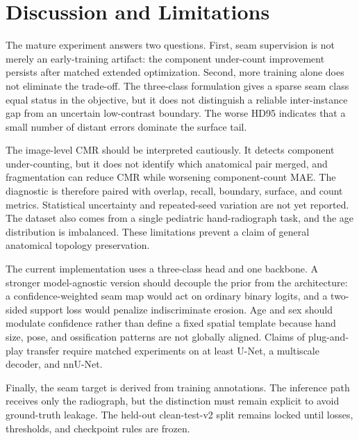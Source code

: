 \section{Discussion and Limitations}

The mature experiment answers two questions. First, seam supervision is not merely an early-training artifact: the component under-count improvement persists after matched extended optimization. Second, more training alone does not eliminate the trade-off. The three-class formulation gives a sparse seam class equal status in the objective, but it does not distinguish a reliable inter-instance gap from an uncertain low-contrast boundary. The worse HD95 indicates that a small number of distant errors dominate the surface tail.

The image-level CMR should be interpreted cautiously. It detects component under-counting, but it does not identify which anatomical pair merged, and fragmentation can reduce CMR while worsening component-count MAE. The diagnostic is therefore paired with overlap, recall, boundary, surface, and count metrics. Statistical uncertainty and repeated-seed variation are not yet reported. The dataset also comes from a single pediatric hand-radiograph task, and the age distribution is imbalanced. These limitations prevent a claim of general anatomical topology preservation.

The current implementation uses a three-class head and one backbone. A stronger model-agnostic version should decouple the prior from the architecture: a confidence-weighted seam map would act on ordinary binary logits, and a two-sided support loss would penalize indiscriminate erosion. Age and sex should modulate confidence rather than define a fixed spatial template because hand size, pose, and ossification patterns are not globally aligned. Claims of plug-and-play transfer require matched experiments on at least U-Net, a multiscale decoder, and nnU-Net.

Finally, the seam target is derived from training annotations. The inference path receives only the radiograph, but the distinction must remain explicit to avoid ground-truth leakage. The held-out clean-test-v2 split remains locked until losses, thresholds, and checkpoint rules are frozen.
